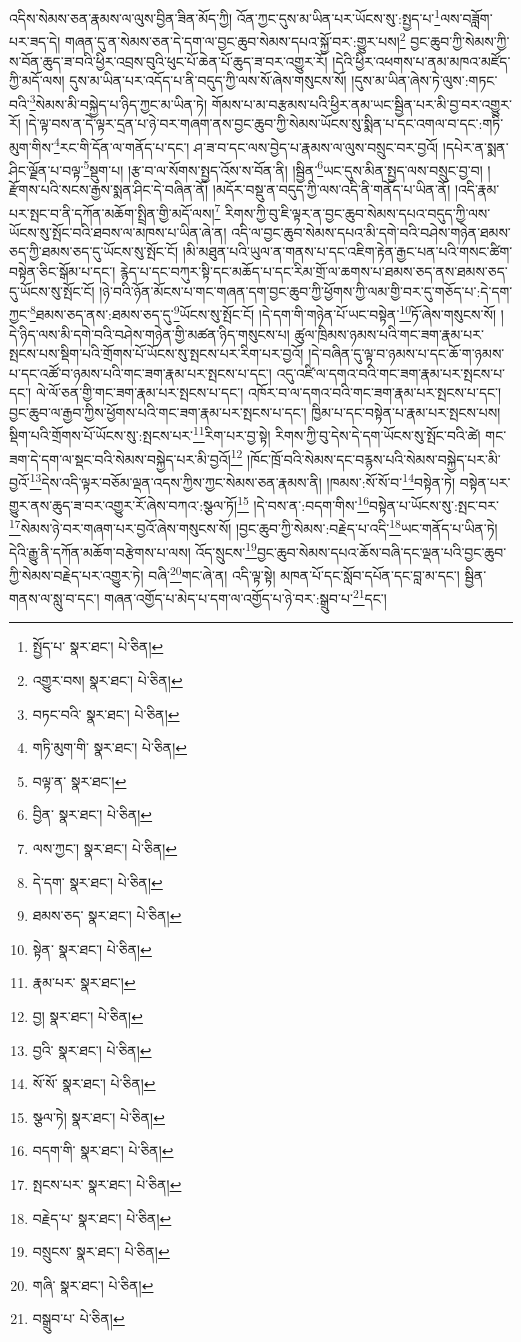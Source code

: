 འདིས་སེམས་ཅན་རྣམས་ལ་ལུས་བྱིན་ཟིན་མོད་ཀྱི། འོན་ཀྱང་དུས་མ་ཡིན་པར་ཡོངས་སུ་:སྤྱད་པ་\footnote{སྤྱོད་པ་  སྣར་ཐང་།  པེ་ཅིན། }ལས་བཟློག་པར་ཟད་དེ། གཞན་དུ་ན་སེམས་ཅན་དེ་དག་ལ་བྱང་ཆུབ་སེམས་དཔའ་སྐྱོ་བར་:གྱུར་པས།\footnote{འགྱུར་བས།  སྣར་ཐང་།  པེ་ཅིན། } བྱང་ཆུབ་ཀྱི་སེམས་ཀྱི་ས་བོན་ཆུད་ཟ་བའི་ཕྱིར་འབྲས་བུའི་ཕུང་པོ་ཆེན་པོ་ཆུད་ཟ་བར་འགྱུར་རོ། །དེའི་ཕྱིར་འཕགས་པ་ནམ་མཁའ་མཛོད་ཀྱི་མདོ་ལས། དུས་མ་ཡིན་པར་འདོད་པ་ནི་བདུད་ཀྱི་ལས་སོ་ཞེས་གསུངས་སོ། །དུས་མ་ཡིན་ཞེས་ཏེ་ལུས་:གཏང་བའི་\footnote{བཏང་བའི་  སྣར་ཐང་།  པེ་ཅིན། }སེམས་མི་བསྐྱེད་པ་ཉིད་ཀྱང་མ་ཡིན་ཏེ། གོམས་པ་མ་བརྩམས་པའི་ཕྱིར་ནམ་ཡང་སྦྱིན་པར་མི་བྱ་བར་འགྱུར་རོ། །དེ་ལྟ་བས་ན་དེ་ལྟར་དྲན་པ་ཉེ་བར་གཞག་ནས་བྱང་ཆུབ་ཀྱི་སེམས་ཡོངས་སུ་སྨིན་པ་དང་འགལ་བ་དང་:གཏི་མུག་གིས་\footnote{གཏི་མུག་གི་  སྣར་ཐང་།  པེ་ཅིན། }རང་གི་དོན་ལ་གནོད་པ་དང་། ཤ་ཟ་བ་དང་ལས་བྱེད་པ་རྣམས་ལ་ལུས་བསྲུང་བར་བྱའོ། །དཔེར་ན་སྨན་ཤིང་ལྗོན་པ་བལྟ་\footnote{བལྟ་ན་  སྣར་ཐང་། }སྡུག་པ། །རྩ་བ་ལ་སོགས་སྤྱད་འོས་ས་བོན་ནི། །སྦྱིན་\footnote{བྱིན་  སྣར་ཐང་།  པེ་ཅིན། }ཡང་དུས་མིན་སྤྱད་ལས་བསྲུང་བྱ་བ། །རྫོགས་པའི་སངས་རྒྱས་སྨན་ཤིང་དེ་བཞིན་ནོ། །མདོར་བསྡུ་ན་བདུད་ཀྱི་ལས་འདི་ནི་གནོད་པ་ཡིན་ནོ། །འདི་རྣམ་པར་སྤང་བ་ནི་དཀོན་མཆོག་སྤྲིན་གྱི་མདོ་ལས།\footnote{ལས་ཀྱང་།  སྣར་ཐང་།  པེ་ཅིན། } རིགས་ཀྱི་བུ་ཇི་ལྟར་ན་བྱང་ཆུབ་སེམས་དཔའ་བདུད་ཀྱི་ལས་ཡོངས་སུ་སྤོང་བའི་ཐབས་ལ་མཁས་པ་ཡིན་ཞེ་ན། འདི་ལ་བྱང་ཆུབ་སེམས་དཔའ་མི་དགེ་བའི་བཤེས་གཉེན་ཐམས་ཅད་ཀྱི་ཐམས་ཅད་དུ་ཡོངས་སུ་སྤོང་ངོ། །མི་མཐུན་པའི་ཡུལ་ན་གནས་པ་དང་འཇིག་རྟེན་རྒྱང་པན་པའི་གསང་ཚིག་བསྟེན་ཅིང་སྒོམ་པ་དང་། རྙེད་པ་དང་བཀུར་སྟི་དང་མཆོད་པ་དང་རིམ་གྲོ་ལ་ཆགས་པ་ཐམས་ཅད་ནས་ཐམས་ཅད་དུ་ཡོངས་སུ་སྤོང་ངོ། །ཉེ་བའི་ཉོན་མོངས་པ་གང་གཞན་དག་བྱང་ཆུབ་ཀྱི་ཕྱོགས་ཀྱི་ལམ་གྱི་བར་དུ་གཅོད་པ་:དེ་དག་ཀྱང་\footnote{དེ་དག་  སྣར་ཐང་།  པེ་ཅིན། }ཐམས་ཅད་ནས་:ཐམས་ཅད་དུ་\footnote{ཐམས་ཅད་  སྣར་ཐང་།  པེ་ཅིན། }ཡོངས་སུ་སྤོང་ངོ། །དེ་དག་གི་གཉེན་པོ་ཡང་བསྟེན་\footnote{སྟེན་  སྣར་ཐང་།  པེ་ཅིན། }ཏོ་ཞེས་གསུངས་སོ། །དེ་ཉིད་ལས་མི་དགེ་བའི་བཤེས་གཉེན་གྱི་མཚན་ཉིད་གསུངས་པ། ཚུལ་ཁྲིམས་ཉམས་པའི་གང་ཟག་རྣམ་པར་སྤངས་པས་སྡིག་པའི་གྲོགས་པོ་ཡོངས་སུ་སྤངས་པར་རིག་པར་བྱའོ། །དེ་བཞིན་དུ་ལྟ་བ་ཉམས་པ་དང་ཆོ་ག་ཉམས་པ་དང་འཚོ་བ་ཉམས་པའི་གང་ཟག་རྣམ་པར་སྤངས་པ་དང་། འདུ་འཛི་ལ་དགའ་བའི་གང་ཟག་རྣམ་པར་སྤངས་པ་དང་། ལེ་ལོ་ཅན་གྱི་གང་ཟག་རྣམ་པར་སྤངས་པ་དང་། འཁོར་བ་ལ་དགའ་བའི་གང་ཟག་རྣམ་པར་སྤངས་པ་དང་། བྱང་ཆུབ་ལ་རྒྱབ་ཀྱིས་ཕྱོགས་པའི་གང་ཟག་རྣམ་པར་སྤངས་པ་དང་། ཁྱིམ་པ་དང་བསྟེན་པ་རྣམ་པར་སྤངས་པས། སྡིག་པའི་གྲོགས་པོ་ཡོངས་སུ་:སྤངས་པར་\footnote{རྣམ་པར་  སྣར་ཐང་། }རིག་པར་བྱ་སྟེ། རིགས་ཀྱི་བུ་དེས་དེ་དག་ཡོངས་སུ་སྤོང་བའི་ཚེ། གང་ཟག་དེ་དག་ལ་སྡང་བའི་སེམས་བསྐྱེད་པར་མི་བྱའོ།\footnote{བྱ།  སྣར་ཐང་།  པེ་ཅིན། } །ཁོང་ཁྲོ་བའི་སེམས་དང་བརྙས་པའི་སེམས་བསྐྱེད་པར་མི་བྱའོ་\footnote{བྱའི་  སྣར་ཐང་།  པེ་ཅིན། }དེས་འདི་ལྟར་བཅོམ་ལྡན་འདས་ཀྱིས་ཀྱང་སེམས་ཅན་རྣམས་ནི། །ཁམས་:སོ་སོ་བ་\footnote{སོ་སོ་  སྣར་ཐང་།  པེ་ཅིན། }བསྟེན་ཏེ། བསྟེན་པར་གྱུར་ནས་ཆུད་ཟ་བར་འགྱུར་རོ་ཞེས་བཀའ་:སྩལ་ཏོ།\footnote{སྩལ་ཏེ།  སྣར་ཐང་།  པེ་ཅིན། } །དེ་བས་ན་:བདག་གིས་\footnote{བདག་གི་  སྣར་ཐང་།  པེ་ཅིན། }བསྟེན་པ་ཡོངས་སུ་:སྤང་བར་\footnote{སྤངས་པར་  སྣར་ཐང་།  པེ་ཅིན། }སེམས་ཉེ་བར་གཞག་པར་བྱའོ་ཞེས་གསུངས་སོ། །བྱང་ཆུབ་ཀྱི་སེམས་:བརྗེད་པ་འདི་\footnote{བརྗེད་པ་  སྣར་ཐང་།  པེ་ཅིན། }ཡང་གནོད་པ་ཡིན་ཏེ། དེའི་རྒྱུ་ནི་དཀོན་མཆོག་བརྩེགས་པ་ལས། འོད་སྲུངས་\footnote{བསྲུངས་  སྣར་ཐང་།  པེ་ཅིན། }བྱང་ཆུབ་སེམས་དཔའ་ཆོས་བཞི་དང་ལྡན་པའི་བྱང་ཆུབ་ཀྱི་སེམས་བརྗེད་པར་འགྱུར་ཏེ། བཞི་\footnote{གཞི་  སྣར་ཐང་།  པེ་ཅིན། }གང་ཞེ་ན། འདི་ལྟ་སྟེ། མཁན་པོ་དང་སློབ་དཔོན་དང་བླ་མ་དང་། སྦྱིན་གནས་ལ་སླུ་བ་དང་། གཞན་འགྱོད་པ་མེད་པ་དག་ལ་འགྱོད་པ་ཉེ་བར་:སྒྲུབ་པ་\footnote{བསྒྲུབ་པ་  པེ་ཅིན། }དང་། 